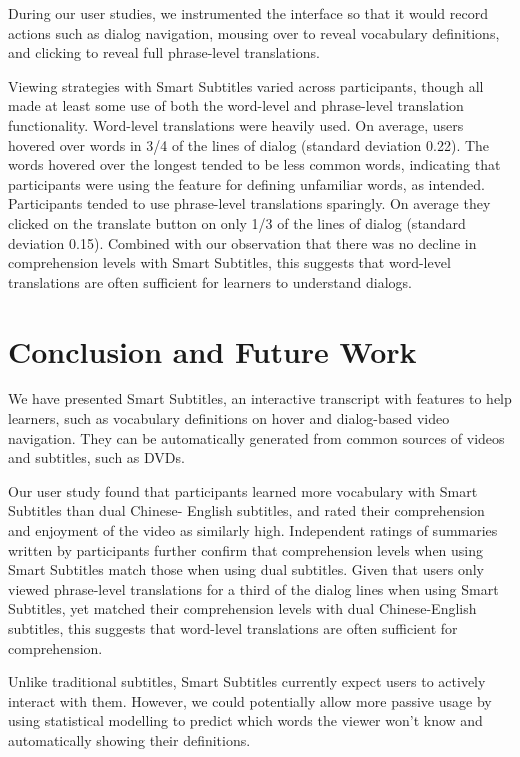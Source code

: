 \documentclass{sigchi}
\begin{document}
During our user studies, we instrumented the interface so that it would record actions such as dialog navigation, mousing over to reveal vocabulary definitions, and clicking to reveal full phrase-level translations.

Viewing strategies with Smart Subtitles varied across
participants, though all made at least some use of both
the word-level and phrase-level translation functionality.
Word-level translations were heavily used. On average,
users hovered over words in 3/4 of the lines of dialog
(standard deviation 0.22).
The words hovered over the longest tended to be less
common words, indicating that participants were using
the feature for defining unfamiliar words, as intended.
Participants tended to use phrase-level translations
sparingly. On average they clicked on the translate
button on only 1/3 of the lines of dialog
(standard deviation 0.15).
Combined with our observation that there was no decline in
comprehension levels with Smart Subtitles, this suggests
that word-level translations are often sufficient for
learners to understand dialogs.

\section{Conclusion and Future Work}

We have presented Smart Subtitles, an interactive
transcript with features to help learners, such as vocabulary
definitions on hover and dialog-based video navigation.
They can be automatically generated from
common sources of videos and subtitles, such as DVDs.

Our user study found that participants learned more
vocabulary with Smart Subtitles than dual Chinese-
English subtitles, and rated their comprehension and
enjoyment of the video as similarly high.
Independent ratings of summaries written by participants
further confirm that comprehension levels when using Smart Subtitles
match those when using dual subtitles.
Given that users only viewed phrase-level translations for a
third of the dialog lines when using Smart Subtitles,
yet matched their comprehension levels with dual Chinese-English subtitles,
this suggests that word-level translations are often sufficient for
comprehension.

Unlike traditional subtitles, Smart Subtitles currently expect users to actively interact with them. However, we could potentially allow more
passive usage by using statistical modelling to predict which words the viewer
won’t know and automatically showing their definitions.
\end{document}
